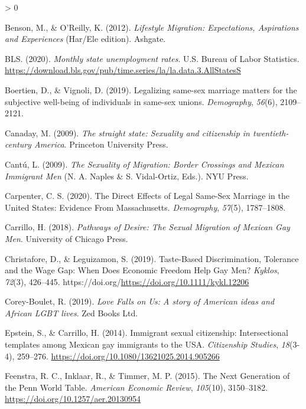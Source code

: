 \documentclass[
  11pt,
]{article}
\newlength{\cslhangindent}
\newenvironment{CSLReferences}[2] %
 {%
  \setlength{\parindent}{0pt}
  \ifodd #1 \everypar{\setlength{\hangindent}{\cslhangindent}}\ignorespaces\fi
  \ifnum #2 > 0
  \setlength{\parskip}{#2\baselineskip}
  \fi
 }%
 {}
\begin{document}
\begin{CSLReferences}{1}{0}
\leavevmode\hypertarget{ref-benson_2012}{}%
Benson, M., \& O'Reilly, K. (2012). \emph{Lifestyle {Migration}: {Expectations}, {Aspirations} and {Experiences}} (Har/Ele edition). Ashgate.

\leavevmode\hypertarget{ref-bls_2020}{}%
BLS. (2020). \emph{Monthly state unemployment rates}. U.S. Bureau of Labor Statistics. \url{https://download.bls.gov/pub/time.series/la/la.data.3.AllStatesS}

\leavevmode\hypertarget{ref-boertien_2019}{}%
Boertien, D., \& Vignoli, D. (2019). Legalizing same-sex marriage matters for the subjective well-being of individuals in same-sex unions. \emph{Demography}, \emph{56}(6), 2109--2121.

\leavevmode\hypertarget{ref-canaday_2009}{}%
Canaday, M. (2009). \emph{The straight state: Sexuality and citizenship in twentieth-century {America}}. Princeton University Press.

\leavevmode\hypertarget{ref-cantu_2009}{}%
Cantú, L. (2009). \emph{The {Sexuality} of {Migration}: {Border} {Crossings} and {Mexican} {Immigrant} {Men}} (N. A. Naples \& S. Vidal-Ortiz, Eds.). NYU Press.

\leavevmode\hypertarget{ref-carpenter_2020}{}%
Carpenter, C. S. (2020). The {Direct} {Effects} of {Legal} {Same}-{Sex} {Marriage} in the {United} {States}: {Evidence} {From} {Massachusetts}. \emph{Demography}, \emph{57}(5), 1787--1808.

\leavevmode\hypertarget{ref-carrillo_2018}{}%
Carrillo, H. (2018). \emph{Pathways of {Desire}: {The} {Sexual} {Migration} of {Mexican} {Gay} {Men}}. University of Chicago Press.

\leavevmode\hypertarget{ref-christafore_2019}{}%
Christafore, D., \& Leguizamon, S. (2019). Taste-{Based} {Discrimination}, {Tolerance} and the {Wage} {Gap}: {When} {Does} {Economic} {Freedom} {Help} {Gay} {Men}? \emph{Kyklos}, \emph{72}(3), 426--445. https://doi.org/\url{https://doi.org/10.1111/kykl.12206}

\leavevmode\hypertarget{ref-corey-boulet_2019}{}%
Corey-Boulet, R. (2019). \emph{Love {Falls} on {Us}: A story of {American} ideas and {African} {LGBT} lives}. Zed Books Ltd.

\leavevmode\hypertarget{ref-epstein_2014}{}%
Epstein, S., \& Carrillo, H. (2014). Immigrant sexual citizenship: Intersectional templates among {Mexican} gay immigrants to the {USA}. \emph{Citizenship Studies}, \emph{18}(3-4), 259--276. \url{https://doi.org/10.1080/13621025.2014.905266}

\leavevmode\hypertarget{ref-feenstra_2015}{}%
Feenstra, R. C., Inklaar, R., \& Timmer, M. P. (2015). The {Next} {Generation} of the {Penn} {World} {Table}. \emph{American Economic Review}, \emph{105}(10), 3150--3182. \url{https://doi.org/10.1257/aer.20130954}


\end{CSLReferences}
\end{document}
